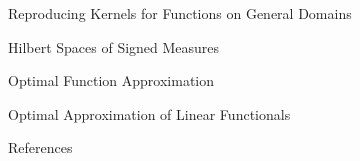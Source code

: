 \documentclass[10pt,compress,xcolor={usenames,dvipsnames},aspectratio=169]{beamer}
\begin{document}
\begin{frame}{Reproducing Kernels for Functions on General Domains}
\end{frame}

\begin{frame}{Hilbert Spaces of Signed Measures}
\end{frame}


\begin{frame}{Optimal Function Approximation}
\end{frame}

\begin{frame}{Optimal Approximation of  Linear Functionals}
\end{frame}



\thankyouframe

\begin{frame}{References}
    \printbibliography
\end{frame}
\end{document}
